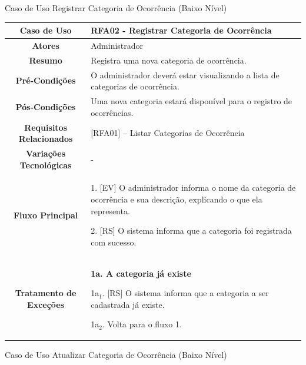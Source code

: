 \begin{apendicesenv}
\begin{quadro}[htb]
\end{quadro}

\begin{quadro}[htb]
	\centering
	\caption{\label{quadro_rfa02}Caso de Uso Registrar Categoria de Ocorrência (Baixo Nível)}
	\small
	\renewcommand{\arraystretch}{1.1}
	
	\begin{tabular}{|c|p{11cm}|}
		\hline
		\textbf{Caso de Uso} & RFA02 - Registrar Categoria de Ocorrência \\ \hline
		\textbf{Atores} & Administrador \\ \hline
		\textbf{Resumo} & Registra uma nova categoria de ocorrência. \\ \hline
		\textbf{Pré-Condições} & O administrador deverá estar visualizando a lista de categorias de ocorrência. \\ \hline
		\textbf{Pós-Condições} & Uma nova categoria estará disponível para o registro de ocorrências. \\ \hline
		\textbf{Requisitos Relacionados} & [RFA01] -- Listar Categorias de Ocorrência \\ \hline
		\textbf{Variações Tecnológicas} & - \\ \hline
		
		\textbf{Fluxo Principal} &
		\parbox[t]{11cm}{
			\raggedright
			1. [EV] O administrador informa o nome da categoria de ocorrência e sua descrição, explicando o que ela representa.\par
			2. [RS] O sistema informa que a categoria foi registrada com sucesso.
		}
		\\ \hline
		
		\textbf{Tratamento de Exceções} &
		\parbox[t]{11cm}{
			\raggedright
			\textbf{1a. A categoria já existe}\par
			1a$_1$. [RS] O sistema informa que a categoria a ser cadastrada já existe.\par
			1a$_2$. Volta para o fluxo 1.
		}
		\\ \hline
	\end{tabular}
	
\end{quadro}

\begin{quadro}[htb]
	\centering
	\caption{\label{quadro_rfa03}Caso de Uso Atualizar Categoria de Ocorrência (Baixo Nível)}
	\small
	\renewcommand{\arraystretch}{1.1}
	

\end{quadro}
\end{apendicesenv}
